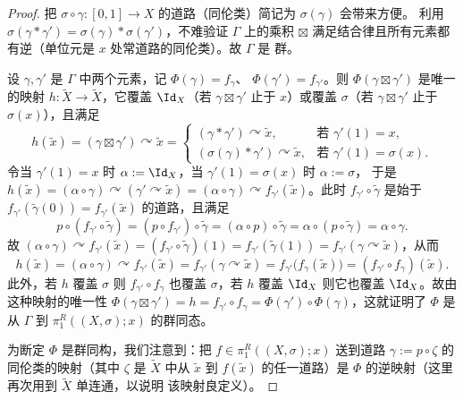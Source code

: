 \begin{proof}
把 $\sigma\circ\gamma:[0,1]\to X$ 的道路（同伦类）简记为 $\sigma(\gamma)$ 会带来方便。
利用 $\sigma(\gamma*\gamma')=\sigma(\gamma)*\sigma(\gamma')$，不难验证 $\Gamma$ 上的乘积
$\boxtimes$ 满足结合律且所有元素都有逆（单位元是 $x$ 处常道路的同伦类）。故 $\Gamma$ 是
群。

设 $\gamma,\gamma'$ 是 $\Gamma$ 中两个元素，记 $\Phi(\gamma)=f_\gamma$、
$\Phi(\gamma')=f_{\gamma'}$。则 $\Phi(\gamma\boxtimes\gamma')$ 是唯一的映射
$h:\tilde X\to\tilde X$，它覆盖 $\Id_X$（若 $\gamma\boxtimes\gamma'$ 止于 $x$）或覆盖
$\sigma$（若 $\gamma\boxtimes\gamma'$ 止于 $\sigma(x)$），且满足
\[
h(\tilde x)=(\gamma\boxtimes\gamma')\curvearrowright\tilde x=
\begin{cases}
(\gamma*\gamma')\curvearrowright\tilde x, & \text{若 } \gamma'(1)=x,\\[0.3em]
(\sigma(\gamma)*\gamma')\curvearrowright\tilde x, & \text{若 } \gamma'(1)=\sigma(x).
\end{cases}
\]
令当 $\gamma'(1)=x$ 时 $\alpha:=\Id_X$，当 $\gamma'(1)=\sigma(x)$ 时 $\alpha:=\sigma$，
于是 $h(\tilde x)=(\alpha\circ\gamma)\curvearrowright(\gamma'\curvearrowright\tilde x)
=(\alpha\circ\gamma)\curvearrowright f_{\gamma'}(\tilde x)$。此时
$f_{\gamma'}\circ\tilde\gamma$ 是始于 $f_{\gamma'}(\tilde\gamma(0))
=f_{\gamma'}(\tilde x)$ 的道路，且满足
\[
p\circ(f_{\gamma'}\circ\tilde\gamma)=(p\circ f_{\gamma'})\circ\tilde\gamma
=(\alpha\circ p)\circ\tilde\gamma
=\alpha\circ(p\circ\tilde\gamma)=\alpha\circ\gamma.
\]
故 $(\alpha\circ\gamma)\curvearrowright f_{\gamma'}(\tilde x)
=(f_{\gamma'}\circ\tilde\gamma)(1)
=f_{\gamma'}(\tilde\gamma(1))
=f_{\gamma'}(\gamma\curvearrowright\tilde x)$，从而
\[
h(\tilde x)=(\alpha\circ\gamma)\curvearrowright f_{\gamma'}(\tilde x)
=f_{\gamma'}(\gamma\curvearrowright\tilde x)
=f_{\gamma'}\bigl(f_\gamma(\tilde x)\bigr)
=(f_{\gamma'}\circ f_\gamma)(\tilde x).
\]
此外，若 $h$ 覆盖 $\sigma$ 则 $f_{\gamma'}\circ f_\gamma$ 也覆盖 $\sigma$，若 $h$ 覆盖
$\Id_X$ 则它也覆盖 $\Id_X$。故由这种映射的唯一性
$\Phi(\gamma\boxtimes\gamma')=h=f_{\gamma'}\circ f_\gamma
=\Phi(\gamma')\circ\Phi(\gamma)$，这就证明了 $\Phi$ 是从 $\Gamma$ 到
$\pi^R_1((X,\sigma);x)$ 的群同态。

为断定 $\Phi$ 是群同构，我们注意到：把 $f\in\pi^R_1((X,\sigma);x)$ 送到道路
$\gamma:=p\circ\zeta$ 的同伦类的映射（其中 $\zeta$ 是 $\tilde X$ 中从 $\tilde x$ 到
$f(\tilde x)$ 的任一道路）是 $\Phi$ 的逆映射（这里再次用到 $\tilde X$ 单连通，以说明
该映射良定义）。
\end{proof}

